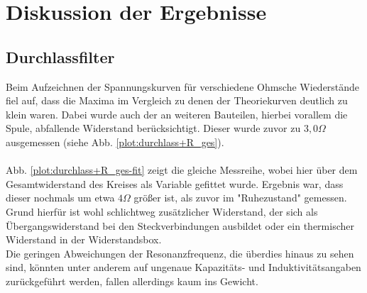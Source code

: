 \section{Diskussion der Ergebnisse}

\subsection{Durchlassfilter}
Beim Aufzeichnen der Spannungskurven für verschiedene Ohmsche Wiederstände fiel auf, dass die Maxima im Vergleich zu denen der Theoriekurven deutlich zu klein waren. Dabei wurde auch der an weiteren Bauteilen, hierbei vorallem die Spule, abfallende Widerstand berücksichtigt. Dieser wurde zuvor zu $ 3,0 \Omega $ ausgemessen (siehe Abb. \ref{plot:durchlass+R_ges}). 
\paragraph{}Abb. \ref{plot:durchlass+R_ges-fit} zeigt die gleiche Messreihe, wobei hier über dem Gesamtwiderstand des Kreises als Variable gefittet wurde. Ergebnis war, dass dieser nochmals um etwa $ 4 \Omega $ größer ist, als zuvor im "Ruhezustand" gemessen. Grund hierfür ist wohl schlichtweg zusätzlicher Widerstand, der sich als Übergangswiderstand bei den Steckverbindungen ausbildet oder ein thermischer Widerstand in der Widerstandsbox.\\
Die geringen Abweichungen der Resonanzfrequenz, die überdies hinaus zu sehen sind, könnten unter anderem auf ungenaue Kapazitäts- und Induktivitätsangaben zurückgeführt werden, fallen allerdings kaum ins Gewicht.
